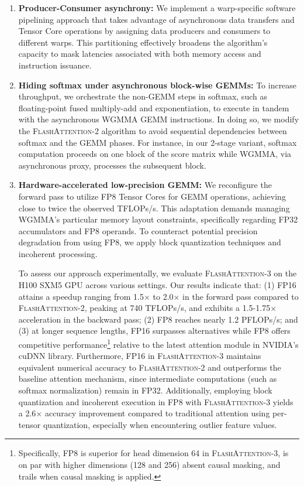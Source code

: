 \begin{enumerate}

\item \textbf{Producer-Consumer asynchrony:} We implement a warp-specific software pipelining approach that takes advantage of asynchronous data transfers and Tensor Core operations by assigning data producers and consumers to different warps. This partitioning effectively broadens the algorithm's capacity to mask latencies associated with both memory access and instruction issuance.

\item \textbf{Hiding softmax under asynchronous block-wise GEMMs:} To increase throughput, we orchestrate the non-GEMM steps in softmax, such as floating-point fused multiply-add and exponentiation, to execute in tandem with the asynchronous WGMMA GEMM instructions. In doing so, we modify the \textsc{FlashAttention-2} algorithm to avoid sequential dependencies between softmax and the GEMM phases. For instance, in our 2-stage variant, softmax computation proceeds on one block of the score matrix while WGMMA, via asynchronous proxy, processes the subsequent block.

\item \textbf{Hardware-accelerated low-precision GEMM:} We reconfigure the forward pass to utilize FP8 Tensor Cores for GEMM operations, achieving close to twice the observed TFLOPs/s. This adaptation demands managing WGMMA’s particular memory layout constraints, specifically regarding FP32 accumulators and FP8 operands. To counteract potential precision degradation from using FP8, we apply block quantization techniques and incoherent processing.

To assess our approach experimentally, we evaluate \textsc{FlashAttention-3} on the H100 SXM5 GPU across various settings. Our results indicate that: (1) FP16 attains a speedup ranging from 1.5$\times$ to 2.0$\times$ in the forward pass compared to \textsc{FlashAttention-2}, peaking at 740 TFLOPs/s, and exhibits a 1.5-1.75$\times$ acceleration in the backward pass; (2) FP8 reaches nearly 1.2 PFLOPs/s; and (3) at longer sequence lengths, FP16 surpasses alternatives while FP8 offers competitive performance\footnote{Specifically, FP8 is superior for head dimension 64 in \textsc{FlashAttention-3}, is on par with higher dimensions (128 and 256) absent causal masking, and trails when causal masking is applied.} relative to the latest attention module in NVIDIA’s cuDNN library. Furthermore, FP16 in \textsc{FlashAttention-3} maintains equivalent numerical accuracy to \textsc{FlashAttention-2} and outperforms the baseline attention mechanism, since intermediate computations (such as softmax normalization) remain in FP32. Additionally, employing block quantization and incoherent execution in FP8 with \textsc{FlashAttention-3} yields a 2.6$\times$ accuracy improvement compared to traditional attention using per-tensor quantization, especially when encountering outlier feature values.


\end{enumerate}
